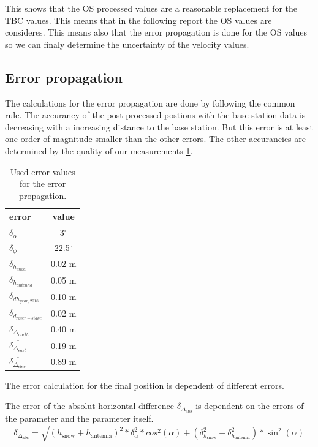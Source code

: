 This shows that the OS processed values are a reasonable replacement for the TBC values.
This means that in the following report the OS values are consideres.
This means also that the error propagation is done for the OS values so we can finaly determine the uncertainty of the velocity values.

\subsection{Error propagation}

The calculations for the error propagation are done by following the common rule.
The accurancy of the post processed postions with the base station data is decreasing with a increasing distance to the base station. 
But this error is at least one order of magnitude smaller than the other errors. 
The other accurancies are determined by the quality of our measurements \ref{GPS:tab:errors}.

\begin{table}[H]
	\caption{Used error values for the error propagation.}
	\centering
	\begin{tabular}{lc}
	\toprule
        error &  value \\
	\midrule
    $ \delta_{\alpha} $ &  3$^{\circ}$ \\
    $ \delta_{\phi} $ &  22.5$^{\circ}$ \\
    $ \delta_{h_{snow}}$ &  0.02 m \\
    $ \delta_{h_{antenna}} $ &  0.05 m \\
    $ \delta_{dh_{year,2018}} $ &  0.10 m \\
    $ \delta_{d_{rover-stake}} $ &  0.02 m \\
    $ \overline{\delta_{\Delta_{north}}} $ & 0.40 m \\
    $ \overline{\delta_{\Delta_{east}}} $ & 0.19 m \\
    $ \overline{\delta_{\Delta_{elev}}} $ & 0.89 m \\
    \bottomrule
	\end{tabular}
	\label{GPS:tab:errors}
\end{table} 

The error calculation for the final position is dependent of different errors.

The error of the absolut horizontal difference $\delta_{\Delta_{\text{abs}}}$ is dependent on the errors of the parameter and the parameter itself.
\begin{equation}
	\delta_{\Delta_{\text{abs}}} = \sqrt{(h_{\text{snow}} + h_{\text{antenna}})^2 * \delta_{\alpha}^2 * cos^2(\alpha) + (\delta_{h_{\text{snow}}}^2 + \delta_{h_{\text{antenna}}}^2) * \sin^2(\alpha)}
\end{equation}

